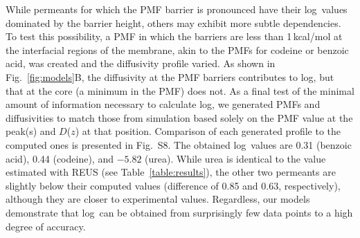   \par While permeants for which the PMF barrier is pronounced have their log\perm~values dominated by the barrier height, others may exhibit more subtle dependencies.  To test this possibility, a PMF in which the barriers are less than 1\,kcal/mol at the interfacial regions of the membrane, akin to the PMFs for codeine or benzoic acid, was created and the diffusivity profile varied.  As shown in Fig.~\ref{fig:models}B, the diffusivity at the PMF barriers contributes to log\perm, but that at the core (a minimum in the PMF) does not.  As a final test of the minimal amount of information necessary to calculate log\perm, we generated PMFs and diffusivities to match those from simulation based solely on the PMF value at the peak(s) and $D$($z$) at that position.  Comparison of each generated profile to the computed ones is presented in Fig.~S8.  The obtained log\perm~values are 0.31 (benzoic acid), 0.44 (codeine), and $-5.82$ (urea).  While urea is identical to the value estimated with REUS (see Table~\ref{table:results}), the other two permeants are slightly below their computed values (difference of 0.85 and 0.63, respectively), although they are closer to experimental values.  Regardless, our models demonstrate that log\perm~can be obtained from surprisingly few data points to a high degree of accuracy.



